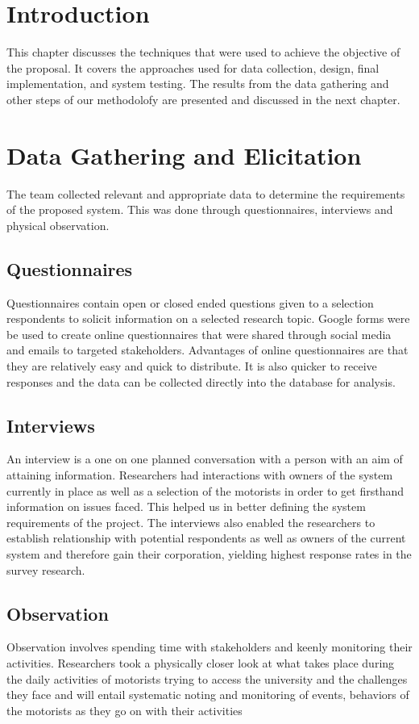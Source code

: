 \section{Introduction}
This chapter discusses the techniques that were used to achieve the objective of the proposal. It covers the approaches used for data collection, design, final implementation, and system testing. The results from the data gathering and other steps of our methodolofy are presented and discussed in the next chapter.


\section{Data Gathering and Elicitation}
The team collected relevant and appropriate data to determine the requirements of the proposed system. This was done through questionnaires, interviews and physical observation\cite{kothari_research_2004}.

\subsection{Questionnaires}
Questionnaires contain open or closed ended questions given to a selection respondents to solicit information on a selected research topic\cite{bartram_using_2019}. Google forms \cite{googleforms} were be used to create online questionnaires that were shared through social media and emails to targeted stakeholders. Advantages of online questionnaires are that they are relatively easy and quick to distribute. It is also quicker to receive responses and the data can be collected directly into the database for analysis.

\subsection{Interviews}
An interview is a one on one planned conversation with a person with an aim of attaining information. Researchers had interactions with owners of the system currently in place as well as a selection of the motorists in order to get firsthand information on issues faced. This helped us in better defining the system requirements of the project. The interviews also enabled the researchers to establish relationship with potential respondents as well as owners of the current system and therefore gain their corporation,  yielding highest response rates in the survey research.

\subsection{Observation}
Observation involves spending time with stakeholders and keenly monitoring their activities. Researchers took a physically closer look at what takes place during the daily activities of motorists trying to access the university and the challenges they face and will entail systematic noting and monitoring of events, behaviors of the motorists as they go on with their activities


